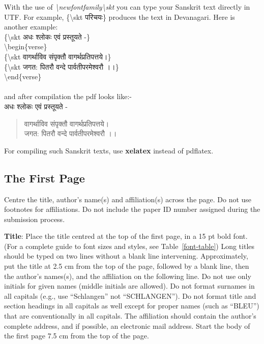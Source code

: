 \documentclass[11pt]{article}
\begin{document}
With the use of {\it \textbackslash newfontfamily\textbackslash skt} you can type your Sanskrit text directly in UTF.
For example, \{\textbackslash skt {\skt परिचयः}\} produces the text in Devanagari. Here is another example:\\
\{\textbackslash skt {\skt अधः श्लोकः एवं प्रस्तूयते -}\}\\
\textbackslash begin\{verse\}\\
\{\textbackslash skt {\skt वागर्थाविव संपृक्तौ वागर्थप्रतिपत्तये।}\}\\
\{\textbackslash skt {\skt जगत: पितरौ वन्दे पार्वतीपरमेश्वरौ ।।}\}\\
\textbackslash end\{verse\}\\\\
and after compilation the pdf looks like:- \\
{\skt अधः श्लोकः एवं प्रस्तूयते -}
\begin{verse}
{\skt वागर्थाविव संपृक्तौ वागर्थप्रतिपत्तये।}\\
{\skt जगत: पितरौ वन्दे पार्वतीपरमेश्वरौ ।।}
\end{verse}
For compiling such Sanskrit texts, use {\bf xelatex} instead of pdflatex.

\subsection{The First Page}
\label{ssec:first}

Centre the title, author's name(s) and affiliation(s) across
the page.
Do not use footnotes for affiliations. Do not include the
paper ID number assigned during the submission process.

{\bf Title}: Place the title centred at the top of the first page, in
a 15 pt bold font. (For a complete guide to font sizes and styles,
see Table~\ref{font-table}) Long titles should be typed on two lines
without a blank line intervening. Approximately, put the title at 2.5
cm from the top of the page, followed by a blank line, then the
author's names(s), and the affiliation on the following line. Do not
use only initials for given names (middle initials are allowed). Do
not format surnames in all capitals (e.g., use ``Schlangen'' not
``SCHLANGEN'').  Do not format title and section headings in all
capitals as well except for proper names (such as ``BLEU'') that are
conventionally in all capitals.  The affiliation should contain the
author's complete address, and if possible, an electronic mail
address. Start the body of the first page 7.5 cm from the top of the
page.
\end{document}
